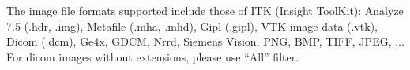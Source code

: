 The image file formats supported include those of ITK (Insight ToolKit):
Analyze 7.5 (.hdr, .img), Metafile (.mha, .mhd), Gipl (.gipl), VTK image data (.vtk), Dicom
(.dcm), Ge4x, GDCM, Nrrd, Siemens Vision, PNG, BMP, TIFF, JPEG, ... For dicom images
without extensions, please use ``All'' filter.
